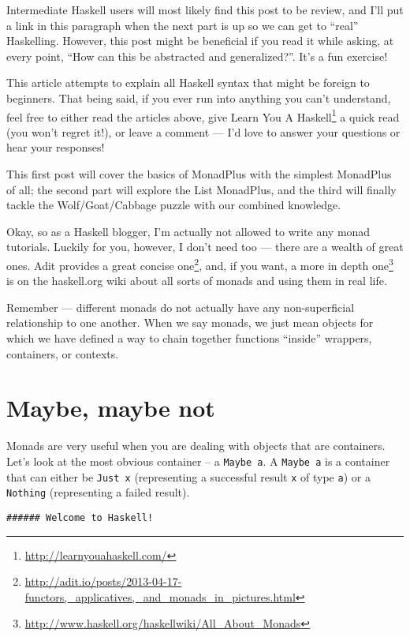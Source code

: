 \documentclass[]{article}
\renewcommand{\href}[2]{#2\footnote{\url{#1}}}
\begin{document}
Intermediate Haskell users will most likely find this post to be review, and I'll put a link in this
paragraph when the next part is up so we can get to ``real'' Haskelling. However, this post might be
beneficial if you read it while asking, at every point, ``How can this be abstracted and
generalized?''. It's a fun exercise!

This article attempts to explain all Haskell syntax that might be foreign to beginners. That being
said, if you ever run into anything you can't understand, feel free to either read the articles
above, give \href{http://learnyouahaskell.com/}{Learn You A Haskell} a quick read (you won't regret
it!), or leave a comment --- I'd love to answer your questions or hear your responses!

This first post will cover the basics of MonadPlus with the simplest MonadPlus of all; the second
part will explore the List MonadPlus, and the third will finally tackle the Wolf/Goat/Cabbage puzzle
with our combined knowledge.

Okay, so as a Haskell blogger, I'm actually not allowed to write any monad tutorials. Luckily for
you, however, I don't need too --- there are a wealth of great ones.
\href{http://adit.io/posts/2013-04-17-functors,_applicatives,_and_monads_in_pictures.html}{Adit
provides a great concise one}, and, if you want,
\href{http://www.haskell.org/haskellwiki/All_About_Monads}{a more in depth one} is on the
haskell.org wiki about all sorts of monads and using them in real life.

Remember --- different monads do not actually have any non-superficial relationship to one another.
When we say monads, we just mean objects for which we have defined a way to chain together functions
``inside'' wrappers, containers, or contexts.

\section{Maybe, maybe not}\label{maybe-maybe-not}

Monads are very useful when you are dealing with objects that are containers. Let's look at the most
obvious container -- a \texttt{Maybe\ a}. A \texttt{Maybe\ a} is a container that can either be
\texttt{Just\ x} (representing a successful result \texttt{x} of type \texttt{a}) or a
\texttt{Nothing} (representing a failed result).

\begin{verbatim}
###### Welcome to Haskell!
\end{verbatim}
\end{document}
